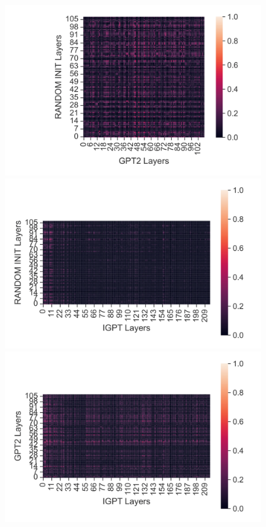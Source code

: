 \documentclass{article}
\begin{document}
\begin{figure}[H]
    \centering
    \begin{minipage}[b]{0.32\linewidth}
        \includegraphics[width=\linewidth]{figs/cka_40_40_dtgpt2_walker2d_medium_666_action.png}
    \end{minipage}
    \begin{minipage}[b]{0.32\linewidth}
        \includegraphics[width=\linewidth]{figs/cka_40_40_dtigpt_walker2d_medium_666_action.png}
    \end{minipage}
    \begin{minipage}[b]{0.32\linewidth}
        \includegraphics[width=\linewidth]{figs/cka_40_40_gpt2igpt_walker2d_medium_666_action.png}

\end{minipage}
\end{figure}
\end{document}
